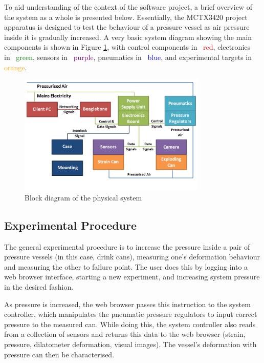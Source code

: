 To aid understanding of the context of the software project, a brief overview of the system as a whole is presented below. Essentially, the MCTX3420 project apparatus is designed to test the behaviour of a pressure vessel as air pressure inside it is gradually increased. A very basic system diagram showing the main components is shown in Figure \ref{system_overview.png}, with control components in  \textcolor{red}{ red}, electronics in  \textcolor{green}{ green}, sensors in  \textcolor{Purple}{ purple}, pneumatics in  \textcolor{blue}{ blue}, and experimental targets in  \textcolor{Orange}{ orange}.

\begin{figure}[H]
	\centering
	\includegraphics[width=0.8\textwidth]{figures/system_overview.png}
	\caption{Block diagram of the physical system} 
	\label{system_overview.png}
\end{figure}

\subsection{Experimental Procedure}

The general experimental procedure is to increase the pressure inside a pair of pressure vessels (in this case, drink cans), measuring one's deformation behaviour and measuring the other to failure point. The user does this by logging into a web browser interface, starting a new experiment, and increasing system pressure in the desired fashion.

As pressure is increased, the web browser passes this instruction to the system controller, which manipulates the pneumatic pressure regulators to input correct pressure to the measured can. While doing this, the system controller also reads from a collection of sensors and returns this data to the web browser (strain, pressure, dilatometer deformation, visual images). The vessel's deformation with pressure can then be characterised.

